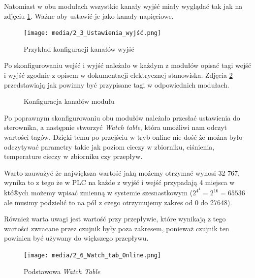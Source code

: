 \documentclass{article}
\begin{document}
Natomiast w obu modułach wszystkie kanały wyjść miały wyglądać tak jak na zdjęciu \ref{fig:zdj6}. Ważne aby ustawić je jako kanały napięciowe.
\begin{figure}[H]
    \centering
    \texttt{[image: media/2\_3\_Ustawienia\_wyjść.png]}
    \caption{Przykład konfiguracji kanałów wyjść}
    \label{fig:zdj6}
\end{figure}
\newpage
Po skonfigurowaniu wejść i wyjść należało w każdym z modułów opisać tagi wejść i wyjść zgodnie z opisem w dokumentacji elektrycznej stanowiska. Zdjęcia \ref{fig:main2} przedstawiają jak powinny być przypisane tagi w odpowiednich modułach.
\begin{figure}[H]
    \centering
    \caption{Konfiguracja kanałów modułu}
    \label{fig:main2}
\end{figure}

Po poprawnym skonfigurowaniu obu modułów należało przesłać ustawienia do sterownika, a następnie stworzyć \textit{Watch table}, która umożliwi nam odczyt wartości tagów. Dzięki temu po przejściu w tryb online nie dość że można było odczytywać parametry takie jak poziom cieczy w zbiorniku, ciśnienia, temperature cieczy w zbiorniku czy przepływ. 

Warto zauważyć że największa wartość jaką możemy otrzymać wynosi 32 767, wynika to z tego że w PLC na każde z wyjść i wejść przypadają 4 miejsca w któ®ych możemy wpisać zmienną w systemie szesnastkowym ($2^{4^4} = 2^{16} = 65536$ ale musimy podzielić to na pół z czego otrzymujemy zakres od 0 do 27648).

Również warta uwagi jest wartość przy przepływie, które wynikają z tego wartości zwracane przez czujnik były poza zakresem, ponieważ czujnik ten powinien być używany do większego przepływu.
\begin{figure}[H]
    \centering
    \texttt{[image: media/2\_6\_Watch\_tab\_Online.png]}
    \caption{Podstawowa \textit{Watch Table}}
    \label{fig:zdj9}
\end{figure}
\end{document}
